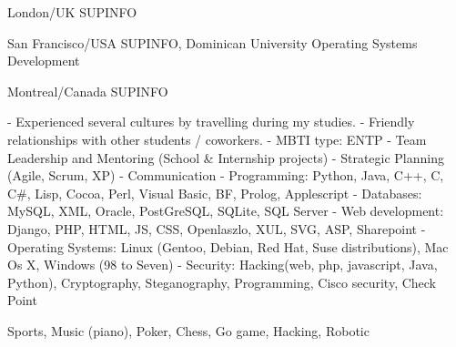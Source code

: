 \documentclass[english]{ecv}
\begin{document}
\begin{ecv}
\ecvBSub{\ecvLanguageTravels}

 {London/UK}
                {SUPINFO}

 {San Francisco/USA}
                {SUPINFO, Dominican University}
                {Operating Systems Development}

 {Montreal/Canada}
                {SUPINFO}

                { - Experienced several cultures by travelling during my
                  studies.\ecvNewLine
                  - Friendly relationships with other students / coworkers.\ecvNewLine
                  - MBTI type: ENTP\ecvNewLine
                }
                {- Team Leadership and Mentoring (School \& Internship projects)
                 - Strategic Planning (Agile, Scrum, XP)
                 - Communication
                }
                {- Programming: Python, Java, C++, C, C\#, Lisp, Cocoa, Perl,
                  Visual Basic, BF, Prolog, Applescript\ecvNewLine
                 - Databases: MySQL, XML, Oracle, PostGreSQL, SQLite, SQL
                 Server\ecvNewLine
                 - Web development: Django, PHP, HTML, JS, CSS, Openlaszlo, XUL,
                 SVG, ASP, Sharepoint\ecvNewLine
                 - Operating Systems: Linux (Gentoo, Debian, Red Hat, Suse
                 distributions), Mac Os X, Windows (98 to Seven)\ecvNewLine
                 - Security: Hacking(web, php, javascript, Java, Python),
                 Cryptography, Steganography, Programming, Cisco security, Check Point}

                {Sports, Music (piano), Poker, Chess, Go game, Hacking, Robotic
                }



\end{ecv}

\end{document}
